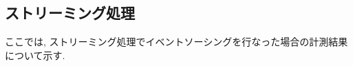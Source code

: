 \documentclass[../../../main]{subfiles}
\begin{document}
    \subsection{ストリーミング処理}\label{subsec:result-streaming}

    ここでは, ストリーミング処理でイベントソーシングを行なった場合の計測結果について示す.

    
    
    

    

    

    
\end{document}
